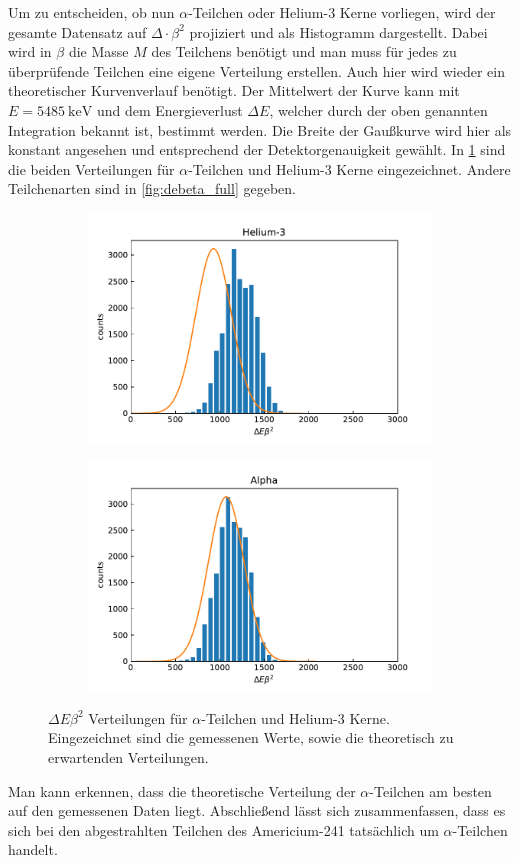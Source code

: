 Um zu entscheiden, ob nun $\alpha$-Teilchen oder Helium-3 Kerne vorliegen, wird der gesamte Datensatz auf $\Delta \cdot \beta^2$ projiziert und als Histogramm dargestellt.
Dabei wird in $\beta$ die Masse $M$ des Teilchens benötigt und man muss für jedes zu überprüfende Teilchen eine eigene Verteilung erstellen.
Auch hier wird wieder ein theoretischer Kurvenverlauf benötigt.
Der Mittelwert der Kurve kann mit $E = \SI{5485}{\kilo\electronvolt}$ und dem Energieverlust $\Delta E$, welcher durch der oben genannten Integration bekannt ist, bestimmt werden.
Die Breite der Gaußkurve wird hier als konstant angesehen und entsprechend der Detektorgenauigkeit gewählt.
In \cref{fig:debeta} sind die beiden Verteilungen für $\alpha$-Teilchen und Helium-3 Kerne eingezeichnet.
Andere Teilchenarten sind in \cref{fig:debeta_full} gegeben.

\begin{figure}[ht]
	\centering
	\begin{subfigure}[c]{0.45\textwidth}
		\centering
		\includegraphics[width=\textwidth]{dat/debeta_Helium-3.pdf}
	\end{subfigure}
	\begin{subfigure}[c]{0.45\textwidth}
		\centering
		\includegraphics[width=\textwidth]{dat/debeta_Alpha.pdf}
	\end{subfigure}
	\caption{$\Delta E \beta^2$ Verteilungen für $\alpha$-Teilchen und Helium-3 Kerne. Eingezeichnet sind die gemessenen Werte, sowie die theoretisch zu erwartenden Verteilungen.}
	\label{fig:debeta}
\end{figure}

Man kann erkennen, dass die theoretische Verteilung der $\alpha$-Teilchen am besten auf den gemessenen Daten liegt.
Abschließend lässt sich zusammenfassen, dass es sich bei den abgestrahlten Teilchen des Americium-241 tatsächlich um $\alpha$-Teilchen handelt.
